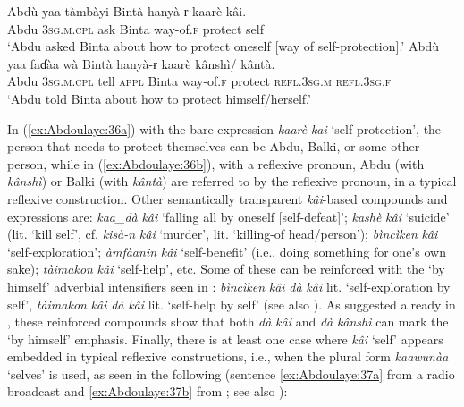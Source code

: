 \documentclass[output=paper]{langscibook}
\begin{document}
\ea%
    \label{ex:Abdoulaye:36}
    \ea \label{ex:Abdoulaye:36a}
    \gll Abdù  yaa  tàmbàyi  Bintà  hanyà-ɍ  kaarè  kâi.\\
    Abdu  \textsc{3sg.m.cpl}  ask  Binta  way-of.\textsc{f}  protect  self\\
    \glt `Abdu asked Binta about how to protect oneself [way of self-protection].’
    \ex \label{ex:Abdoulaye:36b}
    \gll  Abdù\textsubscript{} yaa  faɗàa  wà  Bintà  hanyà-ɍ  kaarè  kânshì/  kântà.\\
    Abdu  \textsc{3sg.m.cpl}  tell  \textsc{appl}  Binta  way-of.\textsc{f}  protect  \textsc{refl.3sg.m}  \textsc{refl.3sg.f}\\
    \glt `Abdu told Binta about how to protect himself/herself.’
    \z
\z
 
        

In (\ref{ex:Abdoulaye:36a}) with the bare expression \textit{kaarè} \textit{kai} ‘self-protection’, the person that needs to protect themselves can be Abdu, Balki, or some other person, while in (\ref{ex:Abdoulaye:36b}), with a reflexive pronoun, Abdu (with \textit{kânshì}) or Balki (with \textit{kântà}) are referred to by the reflexive pronoun, in a typical reflexive construction. Other semantically transparent \textit{kâi}{}-based compounds and expressions are: \textit{kaa\_dà} \textit{kâi} ‘falling all by oneself [self-defeat]’; \textit{kashè} \textit{kâi} ‘suicide’ (lit. ‘kill self’, cf. \textit{kisà\nobreakdash-n} \textit{kâi} ‘murder’, lit. ‘killing\nobreakdash-of head/person’); \textit{bìncìken} \textit{kâi} ‘self-exploration’; \textit{àmfàanin} \textit{kâi} ‘self-benefit’ (i.e., doing something for one’s own sake); \textit{tàimakon} \textit{kâi} ‘self-help’, etc. Some of these can be reinforced with the ‘by himself’ adverbial intensifiers seen in : \textit{bìncìken} \textit{kâi} \textit{dà} \textit{kâi} lit. ‘self-exploration by self’, \textit{tàimakon} \textit{kâi} \textit{dà} \textit{kâi} lit. ‘self-help by self’ (see also \citealt[523]{Newman2000}). As suggested already in , these reinforced compounds show that both \textit{dà} \textit{kâi} and \textit{dà} \textit{kânshì} can mark the ‘by himself’ emphasis. Finally, there is at least one case where \textit{kâi} ‘self’ appears embedded in typical reflexive constructions, i.e., when the plural form \textit{kaawunàa} ‘selves’ is used, as seen in the following (sentence \ref{ex:Abdoulaye:37a} from a radio broadcast and \ref{ex:Abdoulaye:37b} from \citealt[383]{Jaggar2001}; see also \citealt[45]{Abdoulaye2018}):
\end{document}
